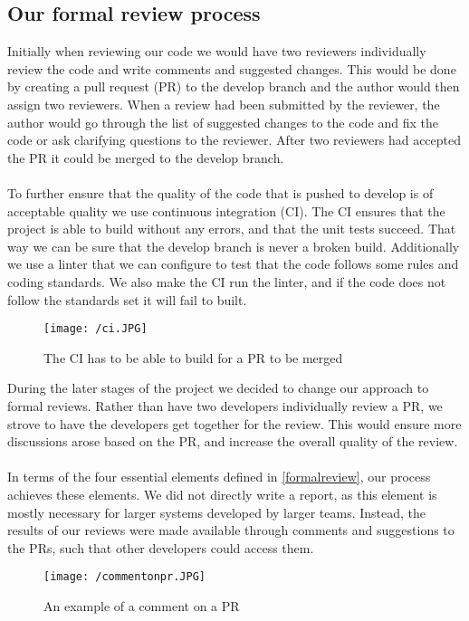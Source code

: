 \subsection{Our formal review process}
Initially when reviewing our code we would have two reviewers individually review the code and write comments and suggested changes. 
This would be done by creating a pull request (PR) to the develop branch and the author would then assign two reviewers.
When a review had been submitted by the reviewer, the author would go through the list of suggested changes to the code and fix the code or ask clarifying questions to the reviewer.
After two reviewers had accepted the PR it could be merged to the develop branch. 
\\\\
To further ensure that the quality of the code that is pushed to develop is of acceptable quality we use continuous integration (CI).
The CI ensures that the project is able to build without any errors, and that the unit tests succeed. 
That way we can be sure that the develop branch is never a broken build.
Additionally we use a linter that we can configure to test that the code follows some rules and coding standards. 
We also make the CI run the linter, and if the code does not follow the standards set it will fail to built.
\begin{figure}[H]
    \texttt{[image: /ci.JPG]}
    \caption{The CI has to be able to build for a PR to be merged}
    \label{fig:continous-integration}
\end{figure}
\noindent
During the later stages of the project we decided to change our approach to formal reviews.
Rather than have two developers individually review a PR, we strove to have the developers get together for the review.
This would ensure more discussions arose based on the PR, and increase the overall quality of the review.
\\\\
In terms of the four essential elements defined in \autoref{formalreview}, our process achieves these elements.
We did not directly write a report, as this element is mostly necessary for larger systems developed by larger teams.
Instead, the results of our reviews were made available through comments and suggestions to the PRs, such that other developers could access them.
\begin{figure}[H]
    \texttt{[image: /commentonpr.JPG]}
    \caption{An example of a comment on a PR}
    \label{fig:comment-on-pr}
\end{figure}
